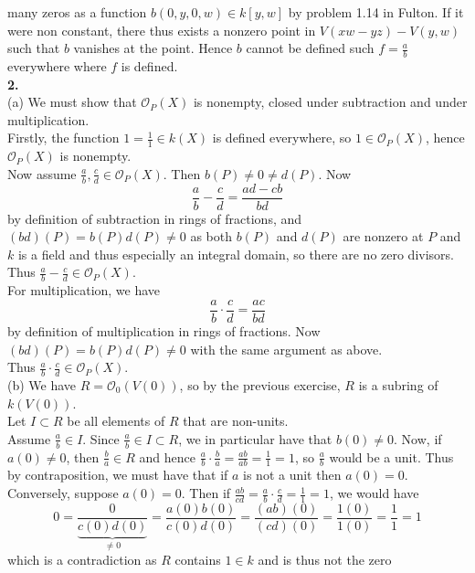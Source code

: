 \documentclass[a4paper]{article}
\begin{document}
  many zeros as a function $b(0,y,0,w) \in k\left[ y,w \right] $ by problem
  1.14 in Fulton. If it were non constant, there thus exists a nonzero point
  in $V(xw-yz)- V(y,w)$  such that $b$ vanishes at the point. Hence $b$ cannot
  be defined such $f = \frac{a}{b}$ everywhere where $f$ is defined.\\
  \linebreak
 \textbf{2.}\\
 (a) We must show that $\mathcal{O}_{P}(X)$ is nonempty, closed under
 subtraction and under multiplication.\\
 Firstly, the function $1 = \frac{1}{1} \in k(X)$ is defined everywhere, so
$1 \in \mathcal{O}_P (X)$, hence $\mathcal{O}_P (X)$ is nonempty.\\
Now assume $\frac{a}{b}, \frac{c}{d} \in \mathcal{O}_P(X)$. Then
$b(P) \neq 0 \neq d(P)$. Now
\[
\frac{a}{b} - \frac{c}{d} = \frac{ad - c b}{bd}
\] 
by definition of subtraction in rings of fractions, and $(bd)(P) = b(P) d(P) \neq 0$ as both
$b(P)$ and $d(P)$ are nonzero at $P$ and $k$ is a field and thus especially an
integral domain, so there are no zero divisors. Thus $\frac{a}{b} - \frac{c}{d}
\in \mathcal{O}_P (X)$.\\
For multiplication, we have
\[
\frac{a}{b} \cdot \frac{c}{d} = \frac{ac}{bd}
\] 
by definition of multiplication in rings of fractions. Now $(bd)(P) = b(P) d(P) \neq 0$ with the
same argument as above.\\
Thus $\frac{a}{b}\cdot \frac{c}{d} \in \mathcal{O}_P(X)$.\\
\linebreak
(b) We have $R = \mathcal{O}_0 (V(0))$, so by the previous exercise,
$R$ is a subring of $k(V(0))$.\\
Let $I\subset R$ be all elements of $R$ that are non-units.\\
Assume $\frac{a}{b} \in I$. Since $\frac{a}{b} \in I \subset R$, we in
particular have that $b(0)\neq 0$. Now, if $a(0) \neq 0$, then
$\frac{b}{a} \in R$ and hence $\frac{a}{b} \cdot \frac{b}{a} = \frac{ab}{ab}
= \frac{1}{1} = 1$, so $\frac{a}{b}$ would be a unit. Thus by contraposition,
we must have that if $a$ is not a unit then $a(0)=0$.\\
Conversely, suppose $a(0) = 0$. Then if $\frac{ab}{cd} = \frac{a}{b} \cdot \frac{c}{d}
= \frac{1}{1}=1$, we would have
$$0 = \frac{0}{\underbrace{c(0) d(0)}_{\neq 0}} = \frac{a(0) b(0)}{c(0)d(0)}
=  \frac{(ab)(0)}{(cd)(0)} = \frac{1(0)}{1(0)} = \frac{1}{1} = 1$$
which is a contradiction as $R$ contains $1 \in k$ and is thus not the zero
\end{document}
